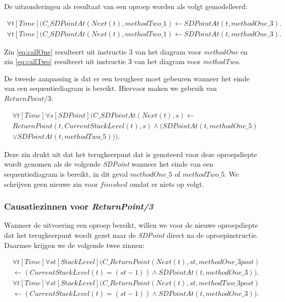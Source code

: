 De uitzonderingen als resultaat van een oproep worden als volgt gemodelleerd:

\begin{align}
	 \forall{t}[Time](C\_SDPointAt(Next(t), methodTwo\_1) \leftarrow SDPointAt(t, methodOne\_3).\label{eq:callOne} \\
	 \forall{t}[Time](C\_SDPointAt(Next(t), methodTwo\_1) \leftarrow SDPointAt(t, methodOne\_3).\label{eq:callTwo}
\end{align}

Zin \ref{eq:callOne} resulteert uit instructie 3 van het diagram voor \textit{methodOne} en zin \ref{eq:callTwo} resulteert uit instructie 3 van het diagram voor \textit{methodTwo}.

De tweede aanpassing is dat er een terugkeer moet gebeuren wanneer het einde van een sequentiediagram is bereikt. Hiervoor maken we gebruik van $ReturnPoint/3$:

\begin{align}
	&\nonumber \forall{t}[Time]\forall{s}[SDPoint](C\_SDPointAt(Next(t), s) \leftarrow \\ \nonumber &ReturnPoint(t, CurrentStackLevel(t), s) \land (SDPointAt(t, methodOne\_5) \\ &\lor SDPointAt(t, methodTwo\_5))).\label{eq:sd-return}
\end{align}

Deze zin drukt uit dat het terugkeerpunt dat is genoteerd voor deze oproepdiepte wordt genomen als de volgende \textit{SDPoint} wanneer het einde van een sequentiediagram is bereikt, in dit geval $methodOne\_5$ of $methodTwo\_5$. We schrijven geen nieuwe zin voor $finished$ omdat er niets op volgt.

\subsubsection{Causatiezinnen voor \textit{ReturnPoint/3}}
Wanneer de uitvoering een oproep bereikt, willen we voor de nieuwe oproepdiepte dat het terugkeerpunt wordt gezet naar de \textit{SDPoint} direct na de oproepinstructie. Daarmee krijgen we de volgende twee zinnen:

\begin{align}
	\nonumber &\forall{t}[Time]\forall{st}[StackLevel](C\_ReturnPoint(Next(t), st, methodOne\_3post) \\ &\leftarrow (CurrentStackLevel(t) = (st-1)) \land SDPointAt(t, methodOne\_3)). \\
	\nonumber &\forall{t}[Time]\forall{st}[StackLevel](C\_ReturnPoint(Next(t), st, methodTwo\_3post) \\ &\leftarrow (CurrentStackLevel(t) = (st-1)) \land SDPointAt(t, methodOne\_3)).
\end{align}

